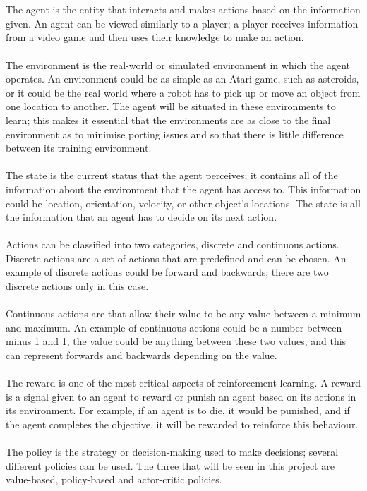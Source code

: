 \documentclass[a4paper,12pt]{article}
\begin{document}
\\\\
The agent is the entity that interacts and makes actions based on the information given. An agent can be viewed similarly to a player; a player receives information from a video game and then uses their knowledge to make an action.
\\\\
The environment is the real-world or simulated environment in which the agent operates. An environment could be as simple as an Atari game, such as asteroids, or it could be the real world where a robot has to pick up or move an object from one location to another. The agent will be situated in these environments to learn; this makes it essential that the environments are as close to the final environment as to minimise porting issues and so that there is little difference between its training environment.
\\\\
The state is the current status that the agent perceives; it contains all of the information about the environment that the agent has access to. This information could be location, orientation, velocity, or other object's locations. The state is all the information that an agent has to decide on its next action.
\\\\
Actions can be classified into two categories, discrete and continuous actions. Discrete actions are a set of actions that are predefined and can be chosen. An example of discrete actions could be forward and backwards; there are two discrete actions only in this case.
\\\\
Continuous actions are that allow their value to be any value between a minimum and maximum. An example of continuous actions could be a number between minus 1 and 1, the value could be anything between these two values, and this can represent forwards and backwards depending on the value.
\\\\
The reward is one of the most critical aspects of reinforcement learning. A reward is a signal given to an agent to reward or punish an agent based on its actions in its environment. For example, if an agent is to die, it would be punished, and if the agent completes the objective, it will be rewarded to reinforce this behaviour.
\\\\
The policy is the strategy or decision-making used to make decisions; several different policies can be used. The three that will be seen in this project are value-based, policy-based and actor-critic policies.
\end{document}
